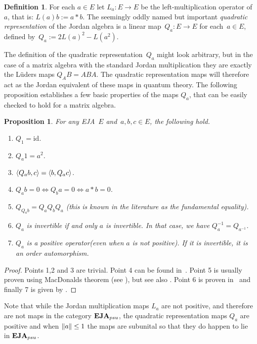 \documentclass[submission,copyright,creativecommons]{eptcs}
\newcounter{main}
\newtheorem{proposition}[main]{Proposition}
\theoremstyle{definition}
\newtheorem{definition}[main]{Definition}
\DeclarePairedDelimiter{\inn}{\langle}{\rangle}
\newcommand{\EJA}{\text{\textbf{EJA}}\xspace}
\newcommand{\id}{\mathrm{id}}
\begin{document}
\begin{definition}
    For each $a\in E$ let $L_a: E\rightarrow E$ be the left-multiplication
    operator of $a$, that is: $L(a)b:= a*b$. The seemingly oddly named but important
    \emph{quadratic representation} of the Jordan algebra is
    a linear map~$Q_a\colon E \to E$ for each~$a \in E$, defined by~$Q_a
    := 2L(a)^2 - L(a^2)$.
\end{definition}
The definition of the quadratic representation~$Q_a$ might look
arbitrary, but in the case of a matrix algebra with the standard
Jordan multiplication they are exactly the L\"uders maps $Q_AB = ABA$. The
quadratic representation maps will therefore act as the Jordan
equivalent of these maps in quantum theory. The following proposition
establishes a few basic properties of the maps $Q_a$, that can be
easily checked to hold for a matrix algebra.

\begin{proposition}\label{prop:quadraticrep} For any EJA~$E$ and~$a,b,c \in E$, the following hold.
    \begin{enumerate}
        \item $Q_1 = \id$.
        \item $Q_a1 = a^2$.
        \item $\inn{Q_ab, c} = \inn{b,Q_ac}$.
        \item $Q_ab = 0 \iff Q_ba = 0 \iff a*b=0$.
        \item $Q_{Q_ab} = Q_aQ_bQ_a$ (this is known in the literature as the \emph{fundamental equality}).
        \item $Q_a$ is invertible if and only $a$ is invertible. In that case, we have $Q_a^{-1} = Q_{a^{-1}}$.
        \item $Q_a$ is a positive operator(even when $a$ is not positive). If it is invertible, it is an order automorphism. 
    \end{enumerate}
\end{proposition}
\begin{proof}
    Points 1,2 and 3 are trivial. Point 4 can be found in~\cite[Lemma
    1.26]{alfsen2012geometry}. Point 5 is usually proven using MacDonalds
    theorem (see \cite[Theorem 2.4.13]{hanche1984jordan}),
    but see also \cite{fundident}.
    Point 6 is proven in~\cite[Lemma 1.23]{alfsen2012geometry} and finally
    7 is given by \cite[Theorem 1.25]{alfsen2012geometry}.
\end{proof}

Note that while the Jordan multiplication maps $L_a$ are not positive,
and therefore are not maps in the category $\EJA_{psu}$, the quadratic
representation maps $Q_a$ are positive and when $\norm{a}\leq 1$
the maps are subunital so that they do happen to lie in $\EJA_{psu}$.
\end{document}
